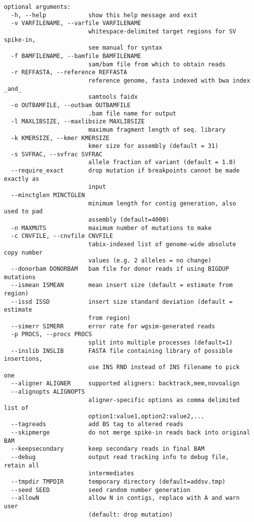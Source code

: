 \documentclass[letterpaper,11pt]{article}
\begin{document}
\begin{verbatim}
optional arguments:
  -h, --help            show this help message and exit
  -v VARFILENAME, --varfile VARFILENAME
                        whitespace-delimited target regions for SV spike-in,
                        see manual for syntax
  -f BAMFILENAME, --bamfile BAMFILENAME
                        sam/bam file from which to obtain reads
  -r REFFASTA, --reference REFFASTA
                        reference genome, fasta indexed with bwa index _and_
                        samtools faidx
  -o OUTBAMFILE, --outbam OUTBAMFILE
                        .bam file name for output
  -l MAXLIBSIZE, --maxlibsize MAXLIBSIZE
                        maximum fragment length of seq. library
  -k KMERSIZE, --kmer KMERSIZE
                        kmer size for assembly (default = 31)
  -s SVFRAC, --svfrac SVFRAC
                        allele fraction of variant (default = 1.0)
  --require_exact       drop mutation if breakpoints cannot be made exactly as
                        input
  --minctglen MINCTGLEN
                        minimum length for contig generation, also used to pad
                        assembly (default=4000)
  -n MAXMUTS            maximum number of mutations to make
  -c CNVFILE, --cnvfile CNVFILE
                        tabix-indexed list of genome-wide absolute copy number
                        values (e.g. 2 alleles = no change)
  --donorbam DONORBAM   bam file for donor reads if using BIGDUP mutations
  --ismean ISMEAN       mean insert size (default = estimate from region)
  --issd ISSD           insert size standard deviation (default = estimate
                        from region)
  --simerr SIMERR       error rate for wgsim-generated reads
  -p PROCS, --procs PROCS
                        split into multiple processes (default=1)
  --inslib INSLIB       FASTA file containing library of possible insertions,
                        use INS RND instead of INS filename to pick one
  --aligner ALIGNER     supported aligners: backtrack,mem,novoalign
  --alignopts ALIGNOPTS
                        aligner-specific options as comma delimited list of
                        option1:value1,option2:value2,...
  --tagreads            add BS tag to altered reads
  --skipmerge           do not merge spike-in reads back into original BAM
  --keepsecondary       keep secondary reads in final BAM
  --debug               output read tracking info to debug file, retain all
                        intermediates
  --tmpdir TMPDIR       temporary directory (default=addsv.tmp)
  --seed SEED           seed random number generation
  --allowN              allow N in contigs, replace with A and warn user
                        (default: drop mutation)
  
\end{verbatim}
\end{document}
